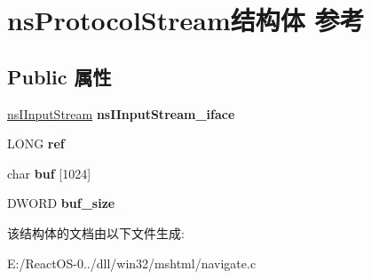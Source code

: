 \hypertarget{structns_protocol_stream}{}\section{ns\+Protocol\+Stream结构体 参考}
\label{structns_protocol_stream}
\subsection*{Public 属性}
\begin{DoxyCompactItemize}
\item 
\mbox{\label{structns_protocol_stream_af9f48c5539ae2defff655aca144349d5}} 
\hyperlink{interfacens_i_input_stream}{ns\+I\+Input\+Stream} {\bfseries ns\+I\+Input\+Stream\+\_\+iface}
\item 
\mbox{\label{structns_protocol_stream_a1b27545ac7edc741759023c70769a4d9}} 
L\+O\+NG {\bfseries ref}
\item 
\mbox{\label{structns_protocol_stream_aaad011bd2b6c43b98a1f32695b2569c6}} 
char {\bfseries buf} \mbox{[}1024\mbox{]}
\item 
\mbox{\label{structns_protocol_stream_ad86dbd3fb9153c1afd6457a3a69c5117}} 
D\+W\+O\+RD {\bfseries buf\+\_\+size}
\end{DoxyCompactItemize}


该结构体的文档由以下文件生成\+:\begin{DoxyCompactItemize}
\item 
E\+:/\+React\+O\+S-\/0../dll/win32/mshtml/navigate.\+c\end{DoxyCompactItemize}

